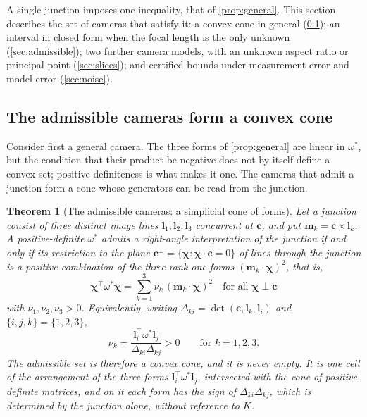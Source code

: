 \documentclass[pdflatex,sn-mathphys-num,iicol]{sn-jnl}
\newcommand{\vl}{\mathbf{l}}
\newcommand{\vc}{\mathbf{c}}
\newcommand{\vm}{\mathbf{m}}
\theoremstyle{thmstyleone}
\newtheorem{theorem}{Theorem}
\theoremstyle{thmstylethree}
\theoremstyle{thmstyletwo}
\begin{document}
A single junction imposes one inequality, that of \cref{prop:general}. This section describes the set of cameras that satisfy it: a convex cone in general (\cref{sec:convex}); an interval in closed form when the focal length is the only unknown (\cref{sec:admissible}); two further camera models, with an unknown aspect ratio or principal point (\cref{sec:slices}); and certified bounds under measurement error and model error (\cref{sec:noise}).

\subsection{The admissible cameras form a convex cone}\label{sec:convex}

Consider first a general camera. The three forms of \cref{prop:general} are linear in $\omega^{*}$, but the condition that their product be negative does not by itself define a convex set; positive-definiteness is what makes it one. The cameras that admit a junction form a cone whose generators can be read from the junction.

\begin{theorem}[The admissible cameras: a simplicial cone of forms]\label{thm:convex}
Let a junction consist of three distinct image lines $\vl_1,\vl_2,\vl_3$ concurrent at $\vc$, and put $\vm_k=\vc\times\vl_k$. A positive-definite $\omega^{*}$ admits a right-angle interpretation of the junction if and only if its restriction to the plane $\vc^{\perp}=\{\boldsymbol\chi:\boldsymbol\chi\cdot\vc=0\}$ of lines through the junction is a positive combination of the three rank-one forms $(\vm_k\cdot\boldsymbol\chi)^2$, that is,
\begin{equation}
\boldsymbol\chi^{\top}\omega^{*}\boldsymbol\chi=\sum_{k=1}^{3}\nu_k\,(\vm_k\cdot\boldsymbol\chi)^2\quad\text{for all }\boldsymbol\chi\perp\vc
\label{eq:simplex}
\end{equation}
with $\nu_1,\nu_2,\nu_3>0$.
Equivalently, writing $\Delta_{ki}=\det(\vc,\vl_k,\vl_i)$ and $\{i,j,k\}=\{1,2,3\}$,
\begin{equation}
\nu_k=\frac{\vl_i^{\top}\omega^{*}\vl_j}{\Delta_{ki}\Delta_{kj}}>0\qquad\text{for }k=1,2,3 .
\label{eq:nuk}
\end{equation}
The admissible set is therefore a convex cone, and it is never empty. It is one cell of the arrangement of the three forms $\vl_i^{\top}\omega^{*}\vl_j$, intersected with the cone of positive-definite matrices, and on it each form has the sign of $\Delta_{ki}\Delta_{kj}$, which is determined by the junction alone, without reference to $K$.
\end{theorem}
\end{document}
